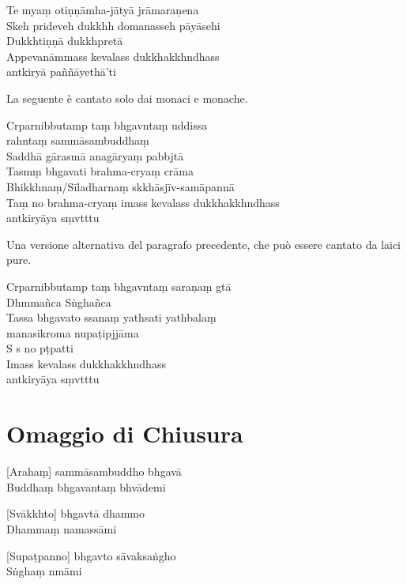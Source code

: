 Te myaṃ otiṇṇāmha-jātyā jrāmaraṇena\\
Skeh prideveh dukkhh domanasseh pāyāsehi\\
Dukkhtiṇṇā dukkhpretā\\
Appevanāmmass kevalass dukkhakkhndhass\\
\vin antkiryā paññāyethā'ti

\begin{instruction}
  La seguente è cantato solo dai monaci e monache.
\end{instruction}

Crparnibbutamp taṃ bhgavntaṃ uddissa\\
\vin {}rahntaṃ sammāsambuddhaṃ\\
Saddhā gārasmā anagāryaṃ pabbjtā\\
Tasmṃ bhgavati brahma-cryaṃ crāma\\
Bhikkhnaṃ/Sīladharnaṃ skkhāsjīv-samāpannā\\
Taṃ no brahma-cryaṃ imass kevalass dukkhakkhndhass\\
\vin antkiryāya sṃvtttu

\clearpage

\begin{instruction}
  Una versione alternativa del paragrafo precedente, che può essere cantato da laici pure.
\end{instruction}

Crparnibbutamp taṃ bhgavntaṃ saraṇaṃ gtā\\
Dhmmañca Sṅghañca\\
Tassa bhgavato ssanaṃ yathsati yathbalaṃ\\
\vin manasikroma nupaṭipjjāma\\
S s no pṭpatti\\
Imass kevalass dukkhakkhndhass\\
\vin antkiryāya sṃvtttu

\chapter{Omaggio di Chiusura}       %

[Arahaṃ] sammāsambuddho bhgavā\\
Buddhaṃ bhgavantaṃ bhvādemi 

[Svākkhto] bhgavtā dhammo\\
Dhammaṃ namassāmi 

[Supaṭpanno] bhgavto sāvaksaṅgho\\
Sṅghaṃ nmāmi 



